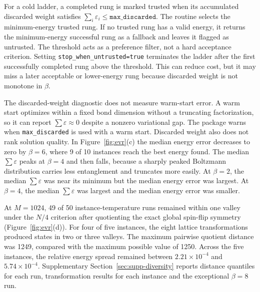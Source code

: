 \documentclass[preprint,12pt,a4paper]{elsarticle}
\begin{document}
For a cold ladder, a completed rung is marked trusted when its accumulated
discarded weight satisfies $\sum_i\varepsilon_i \leq \texttt{max\_discarded}$.
The routine selects the minimum-energy trusted rung. If no trusted rung has a
valid energy, it returns the minimum-energy successful rung as a fallback and
leaves it flagged as untrusted. The threshold acts as a preference filter,
not a hard acceptance criterion. Setting \texttt{stop\_when\_untrusted=true}
terminates the ladder after the first successfully completed rung above the
threshold. This can reduce cost, but it may miss a later acceptable or
lower-energy rung because discarded weight is not monotone in $\beta$.

The discarded-weight diagnostic does not measure warm-start error. A warm start
optimizes within a fixed bond dimension without a truncating factorization, so
it can report $\sum\varepsilon\approx0$ despite a nonzero variational gap. The
package warns when \texttt{max\_discarded} is used with a warm start. Discarded
weight also does not rank solution quality. In
Figure~\ref{fig:evr}(c) the median energy error decreases to zero by $\beta=6$,
where 9 of 10 instances reach the best energy found. The median
$\sum\varepsilon$ peaks at $\beta=4$ and then falls, because a sharply peaked
Boltzmann distribution carries less entanglement and truncates more easily. At
$\beta=2$, the median $\sum\varepsilon$ was near its minimum but the median
energy error was largest. At $\beta=4$, the median $\sum\varepsilon$ was largest
and the median energy error was smaller.

At $M=1024$, 49 of 50 instance-temperature runs remained within one valley under
the $N/4$ criterion after quotienting the exact global spin-flip symmetry
(Figure~\ref{fig:evr}(d)). For four of five instances, the eight lattice
transformations produced states in two or three valleys. The maximum pairwise
quotient distance was 1249, compared with the maximum possible value of 1250.
Across the five instances, the relative energy spread remained between
$2.21\times10^{-4}$ and $5.74\times10^{-4}$.
Supplementary Section~\ref{sec:supp-diversity} reports distance quantiles for
each run, transformation results for each instance and the exceptional
$\beta=8$ run.
\end{document}
